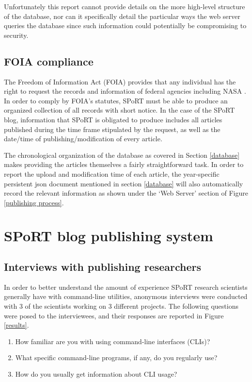 \documentclass[12pt]{article}
\begin{document}
Unfortunately this report cannot provide details on the more high-level structure of the database, nor can it specifically detail the particular ways the web server queries the database since such information could potentially be compromising to security.

\subsection{FOIA compliance}
\label{foia compliance}

The Freedom of Information Act (FOIA) provides that any individual has the right to request the records and information of federal agencies including NASA \cite{foia20}. In order to comply by FOIA's statutes, SPoRT must be able to produce an organized collection of all records with short notice. In the case of the SPoRT blog, information that SPoRT is obligated to produce includes all articles published during the time frame stipulated by the request, as well as the date/time of publishing/modification of every article.

The chronological organization of the database as covered in Section \ref{database} makes providing the articles themselves a fairly straightforward task. In order to report the upload and modification time of each article, the year-specific persistent json document mentioned in section \ref{database} will also automatically record the relevant information as shown under the `Web Server' section of Figure \ref{publishing process}.

\newpage
\section{SPoRT blog publishing system}
\label{publishing}

\subsection{Interviews with publishing researchers}
\label{interviews}

In order to better understand the amount of experience SPoRT research scientists generally have with command-line utilities, anonymous interviews were conducted with 3 of the scientists working on 3 different projects. The following questions were posed to the interviewees, and their responses are reported  in Figure \ref{results}.

\begin{enumerate}
  \item{How familiar are you with using command-line interfaces (CLIs)?}
  \item{What specific command-line programs, if any, do you regularly use?}
  \item{How do you usually get information about CLI usage?}
\end{enumerate}
\end{document}

